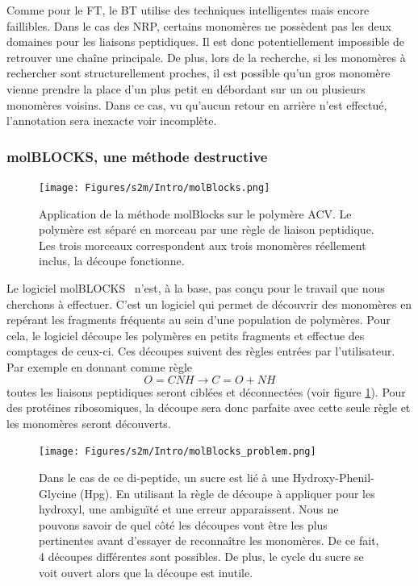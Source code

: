 Comme pour le FT, le BT utilise des techniques intelligentes mais encore faillibles.
Dans le cas des NRP, certains monomères ne possèdent pas les deux domaines pour les liaisons peptidiques.
Il est donc potentiellement impossible de retrouver une chaîne principale.
De plus, lors de la recherche, si les monomères à rechercher sont structurellement proches, il est possible qu'un gros monomère vienne prendre la place d'un plus petit en débordant sur un ou plusieurs monomères voisins.
Dans ce cas, vu qu'aucun retour en arrière n'est effectué, l'annotation sera inexacte voir incomplète.


\subsubsection{molBLOCKS, une méthode destructive}

\begin{figure}[!ht]
  \begin{center}
    \texttt{[image: Figures/s2m/Intro/molBlocks.png]}
    \caption{\label{molBlocks}Application de la méthode molBlocks sur le polymère ACV.
    Le polymère est séparé en morceau par une règle de liaison peptidique.
    Les trois morceaux correspondent aux trois monomères réellement inclus, la découpe fonctionne.}
  \end{center}
\end{figure}

Le logiciel molBLOCKS~\cite{ghersi_molblocks:_2014} n'est, à la base, pas conçu pour le travail que nous cherchons à effectuer.
C'est un logiciel qui permet de découvrir des monomères en repérant les fragments fréquents au sein d'une population de polymères.
Pour cela, le logiciel découpe les polymères en petits fragments et effectue des comptages de ceux-ci.
Ces découpes suivent des règles entrées par l'utilisateur.
Par exemple en donnant comme règle
\begin{equation}
  O=CNH \longrightarrow C=O + NH
\end{equation}
toutes les liaisons peptidiques seront ciblées et déconnectées (voir figure \ref{molBlocks}).
Pour des protéines ribosomiques, la découpe sera donc parfaite avec cette seule règle et les monomères seront découverts.

\begin{figure}[!ht]
  \begin{center}
    \texttt{[image: Figures/s2m/Intro/molBlocks\_problem.png]}
    \caption{\label{molBlocks_problem}Dans le cas de ce di-peptide, un sucre est lié à une Hydroxy-Phenil-Glycine (Hpg).
    En utilisant la règle de découpe à appliquer pour les hydroxyl, une ambiguïté et une erreur apparaissent.
    Nous ne pouvons savoir de quel côté les découpes vont être les plus pertinentes avant d'essayer de reconnaître les monomères.
    De ce fait, 4 découpes différentes sont possibles.
    De plus, le cycle du sucre se voit ouvert alors que la découpe est inutile.}
  \end{center}
\end{figure}


